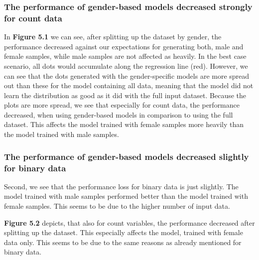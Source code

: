 \documentclass[11pt, a4paper, oneside]{book}
\begin{document}
\subsubsection{The performance of gender-based models decreased strongly for count data}
In \textbf{Figure 5.1} we can see, after splitting up the dataset by gender, the performance decreased against our expectations for generating both, male and female samples, while male samples are not affected as heavily. In the best case scenario, all dots would accumulate along the regression line (red). However, we can see that the dots generated with the gender-specific models are more spread out than these for the model containing all data, meaning that the model did not learn the distribution as good as it did with the full input dataset.
Because the plots are more spread, we see that especially for count data, the performance decreased, when using gender-based models in comparison to using the full dataset. This affects the model trained with female samples more heavily than the model trained with male samples.

\subsubsection{The performance of gender-based models decreased slightly for binary data}
Second, we see that the performance loss for binary data is just slightly. The model trained with male samples performed better than the model trained with female samples. This seems to be due to the higher number of input data.


\textbf{Figure 5.2} depicts, that also for count variables, the performance decreased after splitting up the dataset. This especially affects the model, trained with female data only. This seems to be due to the same reasons as already mentioned for binary data.
\end{document}
